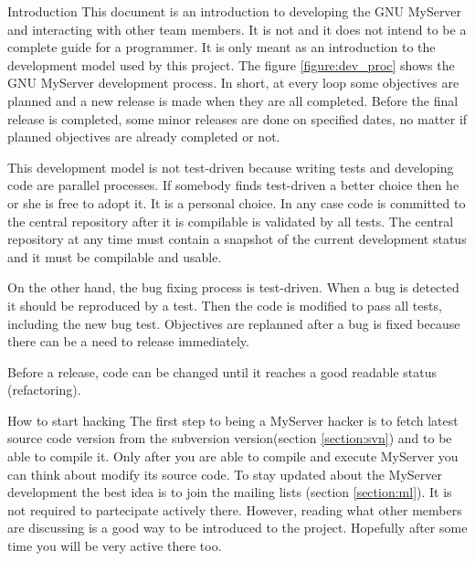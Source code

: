 \documentclass[12pt]{article}
\begin{document}
\begin{section}{Introduction}
This document is an introduction to developing the GNU MyServer and
interacting with other team members.
It is not and it does not intend to be a complete guide for a
programmer. It is only meant as an introduction to the development model used by
this project.
The figure \ref{figure:dev_proc} shows the GNU MyServer development
process.
In short, at every loop some objectives are planned and a new release
is made when they are all completed.
Before the final release is completed, some minor releases are done
on specified dates, no matter if planned objectives are already
completed or not.

This development model is not test-driven because writing tests and
developing code are parallel processes.
If somebody finds test-driven a better choice then he or she is free
to adopt it. It is a personal choice. In any case code is committed
to the central repository after it is compilable is validated
by all tests.
The central repository at any time must contain a snapshot of the
current development status and it must be compilable and usable.

On the other hand, the bug fixing process is test-driven. When a bug is
detected it should be reproduced by a test. Then the code is
modified to pass all tests, including the new bug test.
Objectives are replanned after a bug is fixed because there can be
a need to release immediately.

Before a release, code can be changed until it reaches a good
readable status (refactoring).
\end{section}

\begin{section}{How to start hacking}
The first step to being a MyServer hacker is to fetch latest
source code version from the subversion version(section
\ref{section:svn}) and to be able to compile it. Only after you are able
to compile and execute MyServer you can think about modify its source
code.
To stay updated about the MyServer development the best idea is to join
the mailing lists (section \ref{section:ml}). It is not required to
partecipate actively there. However, reading what other members are discussing
is a good way to be introduced to the project. Hopefully after some
time you will be very active there too.
\end{section}
\end{document}
